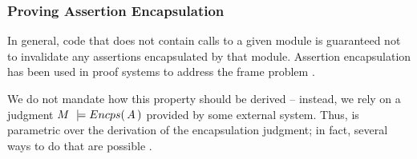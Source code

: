%

\subsubsection{Proving  Assertion Encapsulation}

{In general},  code that does not contain 
calls to a {given} module is guaranteed not to invalidate any assertions encapsulated by that module.
 Assertion encapsulation has been used in proof systems to {address}   the  {frame} problem
 \cite{objInvars,encaps}. 

We  do not mandate how this property should be derived -- instead, we rely on a judgment 
$M\ \models  \encaps{A}$ provided by some external system. 
Thus, \SpecLang is parametric over the derivation of the encapsulation
     judgment; in fact, several ways to do that are possible \cite{TAME2003,ownEncaps,objInvars}. 



